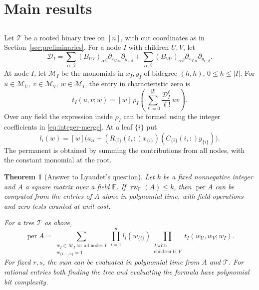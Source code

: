 \documentclass[11pt,reqno]{amsart}
\newtheorem{theorem}{Theorem}[section]
\theoremstyle{remark}
\numberwithin{equation}{section}
\newcommand{\per}{\operatorname{per}}
\newcommand{\F}{\mathbb F}
\begin{document}
\section{Main results}\label{sec:results}

\subsection{}

Let \(\mathcal T\) be a rooted binary tree on \([n]\), with cut
coordinates as in Section~\ref{sec:preliminaries}.
For a node \(I\) with children \(U,V\), let
\[
 \mathcal D_I=
 \sum_{\alpha,\beta}(B_{UV})_{\alpha\beta}
       \partial_{x_{U,\alpha}}\partial_{y_{V,\beta}}
 +\sum_{\alpha,\beta}(B_{VU})_{\alpha\beta}
       \partial_{x_{V,\alpha}}\partial_{y_{U,\beta}} .
\]
At node \(I\), let \(\mathcal M_I\) be the monomials in \(x_I,y_I\)
of bidegree \((h,h)\), \(0\leq h\leq |I|\).
For \(u\in\mathcal M_U,\ v\in\mathcal M_V,\ w\in\mathcal M_I\), the
entry in characteristic zero is
\begin{equation}\label{eq:tree-entries}
 t_I(u,v;w)=[w]\,\rho_I\!\left(
           \sum_{\ell=0}^{|I|}\frac{\mathcal D_I^\ell}{\ell!}\,uv\right).
\end{equation}
Over any field the expression inside \(\rho_I\) can be formed
using the integer coefficients in \eqref{eq:integer-merge}.
At a leaf \(\{i\}\) put
\[
 l_i(w)=[w]\big(a_{ii}+(R_{\{i\}}(i,:)x_{\{i\}})
                              (C_{\{i\}}(i,:)y_{\{i\}})\big).
\]
The permanent is obtained by summing the contributions from all
nodes, with the constant monomial at the root.

\begin{theorem}[Answer to Lyaudet's question]\label{thm:tree}
Let \(k\) be a fixed nonnegative integer and \(A\) a square matrix
over a field \(\F\). If \(\operatorname{rw}_{\F}(A)\leq k\), then
\(\per A\) can be computed from the entries of \(A\) alone in
polynomial time, with field operations and zero tests counted at
unit cost.

For a tree \(\mathcal T\) as above,
\begin{equation}\label{eq:tree-formula}
 \per A=
 \sum_{\substack{w_I\in\mathcal M_I\ \text{for all nodes }I\\
                 w_{\{1,\ldots,n\}}=1}}
 \prod_{i=1}^n l_i(w_{\{i\}})
 \prod_{\substack{I\ \text{with}\\\text{children }U,V}}
       t_I(w_U,w_V;w_I).
\end{equation}
For fixed \(r,s\), the sum can be evaluated in polynomial time
from \(A\) and \(\mathcal T\). For rational entries both finding
the tree and evaluating the formula have polynomial bit complexity.
\end{theorem}
\end{document}
